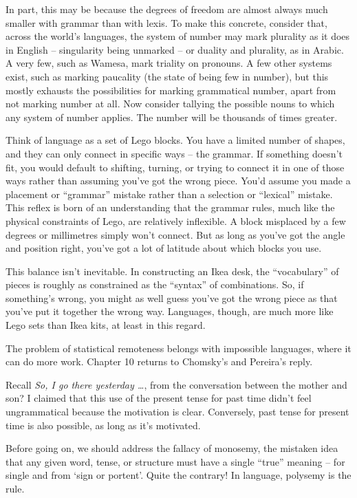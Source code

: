In part, this may be because the degrees of freedom are almost always much smaller with grammar than with lexis. To make this concrete, consider that, across the world's languages, the system of number may mark plurality as it does in English -- singularity being unmarked -- or duality and plurality, as in Arabic. A very few, such as Wamesa, mark triality on pronouns. %
A few other systems exist, such as marking paucality (the state of being few in number), but this mostly exhausts the possibilities for marking grammatical number, apart from not marking number at all. Now consider tallying the possible nouns to which any system of number applies. The number will be thousands of times greater.

Think of language as a set of Lego blocks. You have a limited number of shapes, and they can only connect in specific ways -- the grammar. If something doesn't fit, you would default to shifting, turning, or trying to connect it in one of those ways rather than assuming you've got the wrong piece. You'd assume you made a placement or \enquote{grammar} mistake rather than a selection or \enquote{lexical} mistake. This reflex is born of an understanding that the grammar rules, much like the physical constraints of Lego, are relatively inflexible. A block misplaced by a few degrees or millimetres simply won't connect. But as long as you've got the angle and position right, you've got a lot of latitude about which blocks you use.

This balance isn't inevitable. In constructing an Ikea desk, the \enquote{vocabulary} of pieces is roughly as constrained as the \enquote{syntax} of combinations. So, if something's wrong, you might as well guess you've got the wrong piece as that you've put it together the wrong way. Languages, though, are much more like Lego sets than Ikea kits, at least in this regard.

The problem of statistical remoteness belongs with impossible languages, where it can do more work. Chapter 10 returns to Chomsky's  and Pereira's reply.

Recall \textit{So, I go there yesterday \dots}, from the conversation between the mother and son? I claimed that this use of the present tense for past time didn't feel ungrammatical because the motivation is clear. Conversely, past tense for present time is also possible, as long as it's motivated.

Before going on, we should address the fallacy of monosemy, the mistaken idea that any given word, tense, or structure must have a single \enquote{true} meaning --  for single and  from  `sign or portent'. Quite the contrary! In language, polysemy is the rule.

